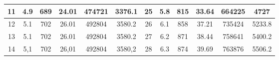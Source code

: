 \begin{table}[]
\begin{tabular}{|ccccccc|c|c|c|c|c|}
\multicolumn{1}{|c|}{11}          & \multicolumn{1}{c|}{4.9}                                                                    & \multicolumn{1}{c|}{689}                                                                     & \multicolumn{1}{c|}{24.01}          & \multicolumn{1}{c|}{474721}         & \multicolumn{1}{c|}{3376.1}      & 25          & 5.8                                                                     & 815                                                                       & 33.64                          & 664225                           & 4727                            \\ \hline
\multicolumn{1}{|c|}{12}          & \multicolumn{1}{c|}{5.1}                                                                    & \multicolumn{1}{c|}{702}                                                                     & \multicolumn{1}{c|}{26.01}          & \multicolumn{1}{c|}{492804}         & \multicolumn{1}{c|}{3580.2}      & 26          & 6.1                                                                     & 858                                                                       & 37.21                          & 735424                           & 5233.8                          \\ \hline
\multicolumn{1}{|c|}{13}          & \multicolumn{1}{c|}{5.1}                                                                    & \multicolumn{1}{c|}{702}                                                                     & \multicolumn{1}{c|}{26.01}          & \multicolumn{1}{c|}{492804}         & \multicolumn{1}{c|}{3580.2}      & 27          & 6.2                                                                     & 871                                                                       & 38.44                          & 758641                           & 5400.2                          \\ \hline
\multicolumn{1}{|c|}{14}          & \multicolumn{1}{c|}{5,1}                                                                    & \multicolumn{1}{c|}{702}                                                                     & \multicolumn{1}{c|}{26,01}          & \multicolumn{1}{c|}{492804}         & \multicolumn{1}{c|}{3580,2}      & 28          & 6.3                                                                     & 874                                                                       & 39.69                          & 763876                           & 5506.2                          \\ \hline

\end{tabular}
\end{table}
